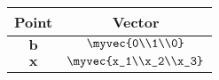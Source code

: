 \begin{tabular}[12pt]{ |c| c|}
    \hline
    \textbf{Point} & \textbf{Vector}\\ 
    \hline
    $\mathbf{b}$ &  $\myvec{0\\1\\0}$\\
    \hline
    $\mathbf{x}$ &   $\myvec{x_1\\x_2\\x_3}$\\
    \hline
    \end{tabular}